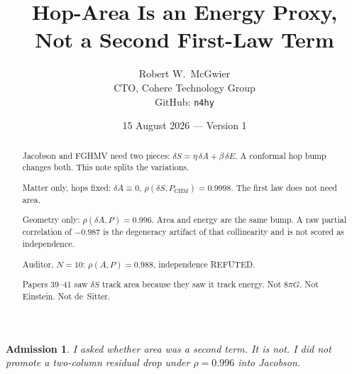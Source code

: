 \documentclass[11pt]{article}
\title{\textbf{Hop-Area Is an Energy Proxy,\\
Not a Second First-Law Term}}
\author{Robert W.\ McGwier\\
\small CTO, Cohere Technology Group\\
\small GitHub: \texttt{n4hy}}
\date{15 August 2026 --- Version 1}
\newtheorem*{admission}{Admission}
\begin{document}
\maketitle

\begin{abstract}
\noindent
Jacobson and FGHMV need two pieces: $\delta S=\eta\,\delta A
+\beta\,\delta E$. A conformal hop bump changes both.
This note splits the variations.

Matter only, hops fixed: $\delta A\equiv 0$,
$\rho(\delta S,P_{\mathrm{CHM}})=0.9998$. The first law
does not need area.

Geometry only: $\rho(\delta A,P)=0.996$. Area and energy
are the same bump. A raw partial correlation of $-0.987$
is the degeneracy artifact of that collinearity and is
not scored as independence.

Auditor, $N=10$: $\rho(A,P)=0.988$, independence REFUTED.

Papers 39--41 saw $\delta S$ track area because they saw
it track energy. Not $8\pi G$. Not Einstein. Not de~Sitter.
\end{abstract}

\begin{admission}
I asked whether area was a second term. It is not. I did
not promote a two-column residual drop under
$\rho=0.996$ into Jacobson.
\end{admission}
\end{document}
